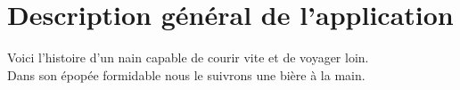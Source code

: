 \section{Description général de l'application}
Voici l'histoire d'un nain capable de courir vite et de voyager loin.\\
Dans son épopée formidable nous le suivrons une bière à la main.\\
